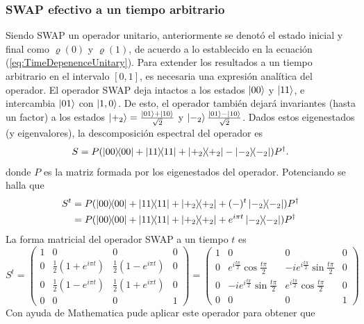 \subsubsection{SWAP efectivo a un tiempo arbitrario}
Siendo \textsc{SWAP} un operador unitario, anteriormente se denotó el estado inicial y final como $\varrho(0)$ y $\varrho(1)$, de acuerdo a lo establecido en la ecuación (\ref{eq:TimeDepenenceUnitary}). Para extender los resultados a un tiempo arbitrario en el intervalo $[0,1]$, es necesaria una expresión analítica del operador. El operador SWAP deja intactos a los estados $\ket{00}$ y $\ket{11}$, e intercambia $\ket{01}$ con $\ket{1,0}$. De esto, el operador también dejará invariantes (hasta un factor) a los estados $\ket{+_{2}}=\frac{\ket{01}+\ket{10}}{\sqrt{2}}$ y $\ket{-_{2}}\frac{\ket{01}-\ket{10}}{\sqrt{2}}$. Dados estos eigenestados (y eigenvalores), la descomposición espectral del operador es
\begin{equation}\label{eq:SWAPSpectral}
S=P(\dyad{00}+\dyad{11}+\dyad{+_{2}}-\dyad{-_{2}})P^{\dag}.
\end{equation}
donde $P$ es la matriz formada por los eigenestados del operador. Potenciando se halla que
\begin{align}\label{eq:SWAPPower}
S^{t}&=P(\dyad{00}+\dyad{11}+\dyad{+_{2}}+(-)^{t}\dyad{-_{2}})P^{\dag}\\
&=P(\dyad{00}+\dyad{11}+\dyad{+_{2}}+e^{i \pi t}\dyad{-_{2}})P^{\dag}
\end{align}
La forma matricial del operador \textsc{SWAP} a un tiempo $t$ es
\begin{equation}
S^{t}=\begin{pmatrix}
 1 & 0 & 0 & 0 \\
 0 & \frac{1}{2}(1+e^{i \pi t}) & \frac{1}{2} (1-e^{i \pi t}) & 0 \\
 0 & \frac{1}{2}(1-e^{i \pi t}) & \frac{1}{2}(1+e^{i \pi t}) & 0 \\
 0 & 0 & 0 & 1
\end{pmatrix}=\begin{pmatrix}
  1 & 0 & 0 & 0 \\
  0 & e^{i\frac{t\pi}{2}}\cos{\frac{t\pi}{2}} & -ie^{i\frac{t\pi}{2}}\sin{\frac{t\pi}{2}} & 0 \\
  0 & -ie^{i\frac{t\pi}{2}}\sin{\frac{t\pi}{2}} & e^{i\frac{t\pi}{2}}\cos{\frac{t\pi}{2}}  & 0 \\
  0 & 0 & 0 & 1
 \end{pmatrix}
\end{equation}
Con ayuda de Mathematica pude aplicar este operador para obtener que
